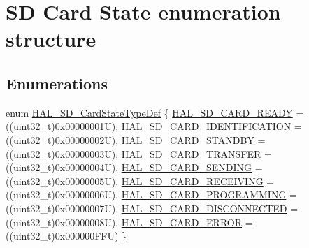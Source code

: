 \hypertarget{group___s_d___exported___types___group2}{}\section{SD Card State enumeration structure}
\label{group___s_d___exported___types___group2}
\subsection*{Enumerations}
\begin{DoxyCompactItemize}
\item 
enum \mbox{\hyperlink{group___s_d___exported___types___group2_ga3926af49b55cec7333a4bc8f05cd4870}{H\+A\+L\+\_\+\+S\+D\+\_\+\+Card\+State\+Type\+Def}} \{ \newline
\mbox{\hyperlink{group___s_d___exported___types___group2_gga3926af49b55cec7333a4bc8f05cd4870a3a798890d71a3e3e797297eb20d30fa6}{H\+A\+L\+\_\+\+S\+D\+\_\+\+C\+A\+R\+D\+\_\+\+R\+E\+A\+DY}} = ((uint32\+\_\+t)0x00000001U), 
\mbox{\hyperlink{group___s_d___exported___types___group2_gga3926af49b55cec7333a4bc8f05cd4870aca10bc5cf56101b698bc56ef3553e7d4}{H\+A\+L\+\_\+\+S\+D\+\_\+\+C\+A\+R\+D\+\_\+\+I\+D\+E\+N\+T\+I\+F\+I\+C\+A\+T\+I\+ON}} = ((uint32\+\_\+t)0x00000002U), 
\mbox{\hyperlink{group___s_d___exported___types___group2_gga3926af49b55cec7333a4bc8f05cd4870a5b3f1ce4c3f1fd44ea3e1aba0aca8e38}{H\+A\+L\+\_\+\+S\+D\+\_\+\+C\+A\+R\+D\+\_\+\+S\+T\+A\+N\+D\+BY}} = ((uint32\+\_\+t)0x00000003U), 
\mbox{\hyperlink{group___s_d___exported___types___group2_gga3926af49b55cec7333a4bc8f05cd4870a34b4c47d6e4ef335a9e54f168a5717fd}{H\+A\+L\+\_\+\+S\+D\+\_\+\+C\+A\+R\+D\+\_\+\+T\+R\+A\+N\+S\+F\+ER}} = ((uint32\+\_\+t)0x00000004U), 
\newline
\mbox{\hyperlink{group___s_d___exported___types___group2_gga3926af49b55cec7333a4bc8f05cd4870adc883b3e06d080a3c7022ab2cc01b57f}{H\+A\+L\+\_\+\+S\+D\+\_\+\+C\+A\+R\+D\+\_\+\+S\+E\+N\+D\+I\+NG}} = ((uint32\+\_\+t)0x00000005U), 
\mbox{\hyperlink{group___s_d___exported___types___group2_gga3926af49b55cec7333a4bc8f05cd4870a62c9fa4a22bfb6969444446de4dbfb9d}{H\+A\+L\+\_\+\+S\+D\+\_\+\+C\+A\+R\+D\+\_\+\+R\+E\+C\+E\+I\+V\+I\+NG}} = ((uint32\+\_\+t)0x00000006U), 
\mbox{\hyperlink{group___s_d___exported___types___group2_gga3926af49b55cec7333a4bc8f05cd4870a8dda04c88ac6b05a19c123edcfe0a4ff}{H\+A\+L\+\_\+\+S\+D\+\_\+\+C\+A\+R\+D\+\_\+\+P\+R\+O\+G\+R\+A\+M\+M\+I\+NG}} = ((uint32\+\_\+t)0x00000007U), 
\mbox{\hyperlink{group___s_d___exported___types___group2_gga3926af49b55cec7333a4bc8f05cd4870a1461c83b88114acab4f9440cc8c00ad5}{H\+A\+L\+\_\+\+S\+D\+\_\+\+C\+A\+R\+D\+\_\+\+D\+I\+S\+C\+O\+N\+N\+E\+C\+T\+ED}} = ((uint32\+\_\+t)0x00000008U), 
\newline
\mbox{\hyperlink{group___s_d___exported___types___group2_gga3926af49b55cec7333a4bc8f05cd4870a7a889c88729f52f5cd51f45f28d2d28f}{H\+A\+L\+\_\+\+S\+D\+\_\+\+C\+A\+R\+D\+\_\+\+E\+R\+R\+OR}} = ((uint32\+\_\+t)0x000000\+F\+FU)
 \}
\end{DoxyCompactItemize}


